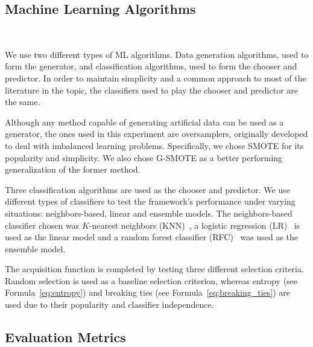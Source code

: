 \documentclass[parskip=full]{scrartcl}
\begin{document}

\subsection{Machine Learning Algorithms}~\label{sec:machine_learning_algorithms}

We use two different types of ML algorithms. Data generation algorithms, used to
form the generator, and classification algorithms, used to form the chooser and
predictor. In order to maintain simplicity and a common approach to most of the
literature in the topic, the classifiers used to play the chooser and predictor
are the same.

Although any method capable of generating artificial data can be used as a
generator, the ones used in this experiment are oversamplers, originally
developed to deal with imbalanced learning problems. Specifically, we chose
SMOTE for its popularity and simplicity. We also chose G-SMOTE as a better
performing generalization of the former method.

Three classification algorithms are used as the chooser and predictor. We use
different types of classifiers to test the framework's performance under varying
situations: neighbors-based, linear and ensemble models. The neighbors-based
classifier chosen was $K$-nearest neighbors (KNN)~\cite{Cover1967}, a logistic
regression (LR)~\cite{Nelder1972} is used as the linear model and a random
forest classifier (RFC)~\cite{Ho1995} was used as the ensemble model.

The acquisition function is completed by testing three different selection
criteria. Random selection is used as a baseline selection criterion, whereas
entropy (see Formula~\ref{eq:entropy}) and breaking ties (see
Formula~\ref{eq:breaking_ties}) are used due to their popularity and classifier
independence. 

\subsection{Evaluation Metrics}~\label{sec:evaluation_metrics}
\end{document}
